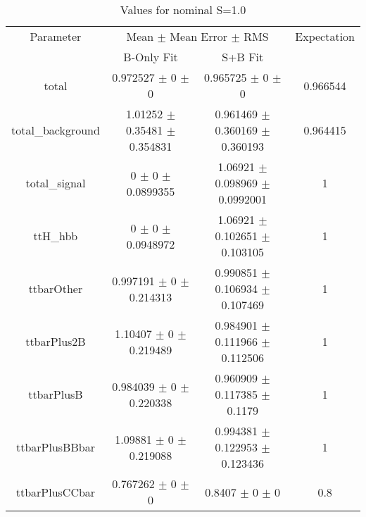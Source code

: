 \begin{table}
\centering
\caption{Values for nominal S=1.0}
\begin{tabular}{cccc}
\toprule
Parameter & \multicolumn{2}{c}{Mean $\pm$ Mean Error $\pm$ RMS} & Expectation\\
 & B-Only Fit & S+B Fit & \\
\midrule
total & \num{0.972527} $\pm$ \num{0} $\pm$ \num{0} & \num{0.965725} $\pm$ \num{0} $\pm$ \num{0} & \num{0.966544}\\
total\_background & \num{1.01252} $\pm$ \num{0.35481} $\pm$ \num{0.354831} & \num{0.961469} $\pm$ \num{0.360169} $\pm$ \num{0.360193} & \num{0.964415}\\
total\_signal & \num{0} $\pm$ \num{0} $\pm$ \num{0.0899355} & \num{1.06921} $\pm$ \num{0.098969} $\pm$ \num{0.0992001} & \num{1}\\
ttH\_hbb & \num{0} $\pm$ \num{0} $\pm$ \num{0.0948972} & \num{1.06921} $\pm$ \num{0.102651} $\pm$ \num{0.103105} & \num{1}\\
ttbarOther & \num{0.997191} $\pm$ \num{0} $\pm$ \num{0.214313} & \num{0.990851} $\pm$ \num{0.106934} $\pm$ \num{0.107469} & \num{1}\\
ttbarPlus2B & \num{1.10407} $\pm$ \num{0} $\pm$ \num{0.219489} & \num{0.984901} $\pm$ \num{0.111966} $\pm$ \num{0.112506} & \num{1}\\
ttbarPlusB & \num{0.984039} $\pm$ \num{0} $\pm$ \num{0.220338} & \num{0.960909} $\pm$ \num{0.117385} $\pm$ \num{0.1179} & \num{1}\\
ttbarPlusBBbar & \num{1.09881} $\pm$ \num{0} $\pm$ \num{0.219088} & \num{0.994381} $\pm$ \num{0.122953} $\pm$ \num{0.123436} & \num{1}\\
ttbarPlusCCbar & \num{0.767262} $\pm$ \num{0} $\pm$ \num{0} & \num{0.8407} $\pm$ \num{0} $\pm$ \num{0} & \num{0.8}\\
\bottomrule
\end{tabular}
\end{table}